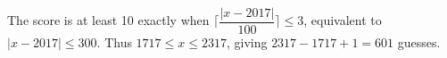 The score is at least 10 exactly when $\lceil\dfrac{|x-2017|}{100}\rceil\le3$, equivalent to $|x-2017|\le300$. Thus $1717\le x\le2317$, giving $2317-1717+1=\boxed{601}$ guesses.
